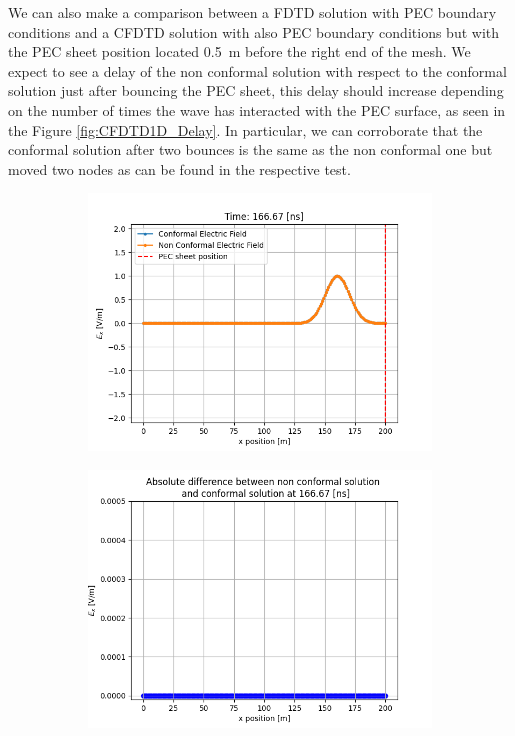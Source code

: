 \documentclass[12pt, oneside]{book}
\begin{document}
We can also make a comparison between a FDTD solution with PEC boundary conditions and a CFDTD solution with also PEC boundary conditions but with the PEC sheet position located \qty{0.5}{m} before the right end of the mesh. We expect to see a delay of the non conformal solution with respect to the conformal solution just after bouncing the PEC sheet, this delay should increase depending on the number of times the wave has interacted with the PEC surface, as seen in the Figure \ref{fig:CFDTD1D_Delay}. In particular, we can corroborate that the conformal solution after two bounces is the same as the non conformal one but moved two nodes as can be found in the respective test. 

\begin{figure}[H]
    \centering
    \begin{subfigure}[b]{0.45\textwidth}
        \centering
        \includegraphics[width=\textwidth]{Imagenes/CFDTD1D_Comparison1.png}
    \end{subfigure}
    \begin{subfigure}[b]{0.45\textwidth}
        \centering
        \includegraphics[width=\textwidth]{Imagenes/CFDTD1D_DelayDifference1.png}
    \end{subfigure}


\end{figure}
\end{document}
